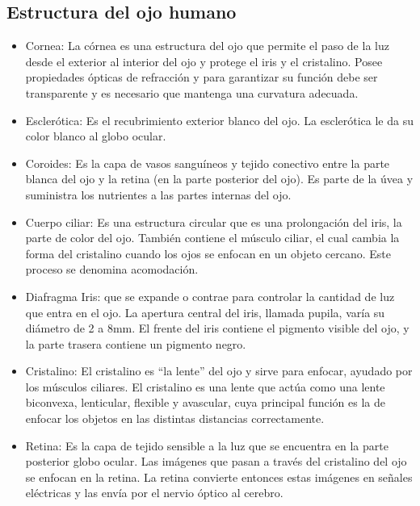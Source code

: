\subsection{Estructura del ojo humano}
\begin{itemize}
\item Cornea: La córnea es una estructura del ojo que permite el paso de la luz 
desde el exterior al interior del ojo y protege el iris y el cristalino. Posee 
propiedades ópticas de refracción y para garantizar su función debe ser transparente 
y es necesario que mantenga una curvatura adecuada.
\item Esclerótica: Es el recubrimiento exterior blanco del ojo. La esclerótica le da 
su color blanco al globo ocular.
\item Coroides: Es la capa de vasos sanguíneos y tejido conectivo entre la parte blanca del ojo y la retina (en la parte posterior del ojo). Es parte de la úvea y suministra los nutrientes a las partes internas del ojo.
\item Cuerpo ciliar: Es una estructura circular que es una prolongación del iris, la 
parte de color del ojo. También contiene el músculo ciliar, el cual cambia la forma 
del cristalino cuando los ojos se enfocan en un objeto cercano. Este proceso se 
denomina acomodación.
\item Diafragma Iris: que se expande o contrae para controlar la cantidad de luz que 
entra en el ojo. La apertura central del iris, llamada pupila, varía su diámetro de 2 
a 8mm. El frente del iris contiene el pigmento visible del ojo, y la parte trasera 
contiene un pigmento negro.
\item Cristalino: El cristalino es “la lente” del ojo y sirve para enfocar, ayudado 
por los músculos ciliares. El cristalino es una lente que actúa como una lente 
biconvexa, lenticular, flexible y avascular, cuya principal función es la de enfocar 
los objetos en las distintas distancias correctamente.
\item Retina: Es la capa de tejido sensible a la luz que se encuentra en la parte 
posterior globo ocular. Las imágenes que pasan a través del cristalino del ojo se 
enfocan en la retina. La retina convierte entonces estas imágenes en señales eléctricas
y las envía por el nervio óptico al cerebro.
\end{itemize}
